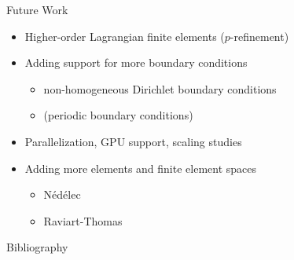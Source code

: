 \documentclass[xcolor=pdftex,table,10pt,yellow,mathserif]{beamer}
\begin{document}
\begin{frame}[t]{Future Work}
    \begin{itemize}
        \item Higher-order Lagrangian finite elements ($p$-refinement)

              \pause

        \item Adding support for more boundary conditions
              \begin{itemize}
                  \item non-homogeneous Dirichlet boundary conditions
                  \item (periodic boundary conditions)
              \end{itemize}

              \pause

        \item Parallelization, GPU support, scaling studies

              \pause

        \item Adding more elements and finite element spaces
              \begin{itemize}
                  \item Nédélec
                  \item Raviart-Thomas
              \end{itemize}
    \end{itemize}
\end{frame}

\begin{frame}[t]{Bibliography}
    \scriptsize
    
\end{frame}
\end{document}
